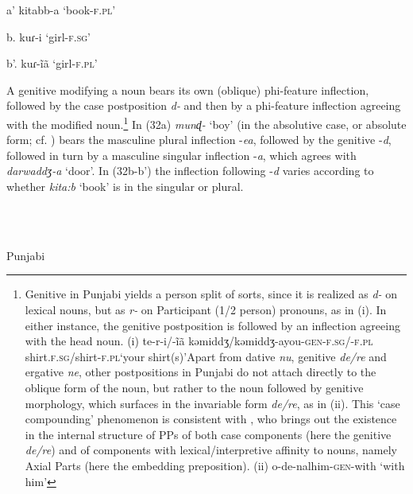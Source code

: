 \documentclass[output=paper]{langsci/langscibook}
\begin{document}
\begin{styleparagrafo}
a’  kitabb-a       ‘book-\textsc{f.pl}’  
\end{styleparagrafo}

\begin{styleparagrafo}
  b.  kuɾ-i         ‘girl-\textsc{f.sg}’
\end{styleparagrafo}

\begin{styleSfondomedioiColorexi}
b’.  kuɾ-ĩã         ‘girl-\textsc{f.pl}’
\end{styleSfondomedioiColorexi}

A genitive modifying a noun bears its own (oblique) phi-feature inflection, followed by the case postposition \textit{d-} and then by a phi-feature inflection agreeing with the modified noun.\footnote{Genitive in Punjabi yields a person split of sorts, since it is realized as \textit{d-} on lexical nouns, but as \textit{r-} on Participant (1/2 person) pronouns, as in (i). In either instance, the genitive postposition is followed by an inflection agreeing with the head noun. (i)    te-r-i/-ĩã    kəmiddʒ/kəmiddʒ-ayou-\textsc{gen-f.sg/-f.pl}  shirt.\textsc{f.sg}/shirt-\textsc{f.pl}‘your shirt(s)’Apart from dative \textit{nu}, genitive \textit{de/re} and ergative \textit{ne}, other postpositions in Punjabi do not attach directly to the oblique form of the noun, but rather to the noun followed by genitive morphology, which surfaces in the invariable form \textit{de/re}, as in (ii). This ‘case compounding’ phenomenon is consistent with \citet{Svenonius2006}, who brings out the existence in the internal structure of PPs of both case components (here the genitive \textit{de/re}) and of components with lexical/interpretive affinity to nouns, namely Axial Parts (here the embedding preposition). (ii)    o-de-nalhim-\textsc{gen}{}-with   ‘with him’} In (32a) \textit{munɖ-} ‘boy’ (in the absolutive case, or absolute form; cf. \citealt{Bailey1904}) bears the masculine plural inflection -\textit{ea}, followed by the genitive -\textit{d}, followed in turn by a masculine singular inflection -\textit{a}, which agrees with \textit{darwaddʒ-a} ‘door’. In (32b-b’) the inflection following -\textit{d} varies according to whether \textit{kita:b} ‘book’ is in the singular or plural. 

\ea%
    \label{ex:key:32}
    \gll\\
        \\
    \glt
    \z

          Punjabi
\end{document}
